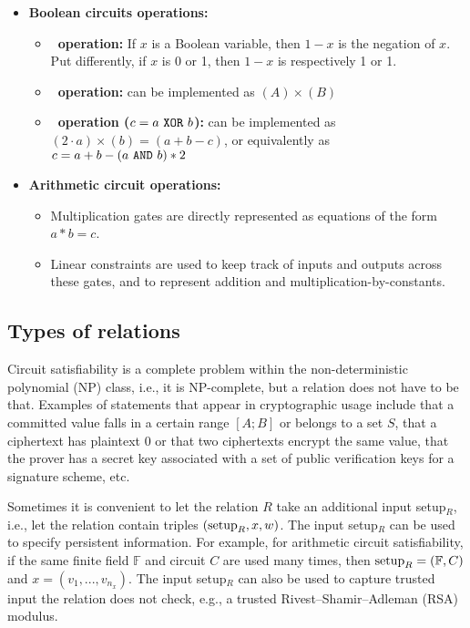 \begin{itemize}


\item \textbf{Boolean circuits operations:}

	\begin{itemize}

	\item \textbf{\NOT\ operation:}
	If $x$ is a Boolean variable, then $1-x$ is the negation of $x$.
	Put differently, if $x$ is 0 or 1, then $1-x$ is respectively 1 or 1.

	\item \textbf{\AND\ operation:} 
	can be implemented as $(A) \times (B)$

	\item \textbf{\XOR\ operation ($c = a~\texttt{XOR}~b$):}
	can be implemented as $(2 \cdot a ) \times (b) = (a + b - c)$, or equivalently as $c = a + b - (a~\texttt{AND}~b) \ast 2$
	\end{itemize}


\item \textbf{Arithmetic circuit operations:} 

	\begin{itemize}
	\item Multiplication gates are directly represented as equations of the form $a \ast b = c$.
	\item Linear constraints are used to keep track of inputs and outputs across these gates, and to represent addition and multiplication-by-constants.
	\end{itemize}

\end{itemize}


\subsection{Types of relations}
\label{security:spec-statements-ZK:types-of-relations}


Circuit satisfiability is a complete problem within the non-deter\-min\-istic polynomial (NP) class, i.e., it is NP-complete, but a relation does not have to be that. 
Examples of statements that appear in cryptographic usage include that a committed value falls in a certain range $[A;B]$ or belongs to a set $S$, that a ciphertext has plaintext 0 or that two ciphertexts encrypt the same value, that the prover has a secret key associated with a set of public verification keys for a signature scheme, etc.


Sometimes it is convenient to let the relation $R$ take an additional input setup$_R$, i.e., let the relation contain triples $(\textmd{setup}_R, x, w)$. 
The input setup$_R$ can be used to specify persistent information.
For example, for arithmetic circuit satisfiability, if the same finite field $\mathbb{F}$ and circuit $C$ are used many times, then $\textmd{setup}_R = (\mathbb{F}, C)$ and $x = (v_1,...,v_{n_x})$.
The input setup$_R$ can also be used to capture trusted input the relation does not check, e.g., a trusted Rivest--Shamir--Adleman (RSA) modulus.
